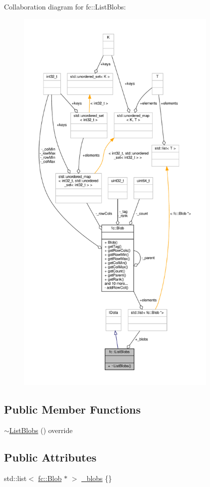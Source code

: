 Collaboration diagram for fc\+:\+:List\+Blobs\+:
\nopagebreak
\begin{figure}[H]
\begin{center}
\leavevmode
\includegraphics[height=550pt]{de/d6e/structfc_1_1ListBlobs__coll__graph}
\end{center}
\end{figure}
\subsection*{Public Member Functions}
\begin{DoxyCompactItemize}
\item 
\hyperlink{structfc_1_1ListBlobs_a00652d45fadd4f508e7705200d72a203}{$\sim$\+List\+Blobs} () override
\end{DoxyCompactItemize}
\subsection*{Public Attributes}
\begin{DoxyCompactItemize}
\item 
std\+::list$<$ \hyperlink{classfc_1_1Blob}{fc\+::\+Blob} $\ast$ $>$ \hyperlink{structfc_1_1ListBlobs_a1de7fecc65a29e085a549aecac224e52}{\+\_\+blobs} \{\}
\end{DoxyCompactItemize}


